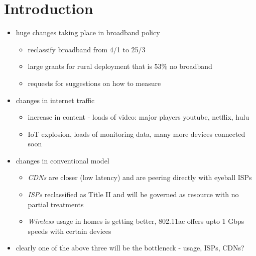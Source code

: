 \section{Introduction}
\label{sec:intro}


\begin{itemize}
\item huge changes taking place in broadband policy
 	\begin{itemize}
 	\item reclassify broadband from 4/1 to 25/3
 	\item large grants for rural deployment that is 53\% no broadband ~\cite{fcc2015progress-report}
 	\item requests for suggestions on how to measure
	\end{itemize}  
\item changes in internet traffic
	\begin{itemize}
	\item increase in content - loads of video: major players youtube, netflix, hulu ~\cite{sandvine2015report}
	\item IoT explosion, loads of monitoring data, many more devices connected soon
	\end{itemize}
\item changes in conventional model
	\begin{itemize}
	\item \emph{CDNs} are closer (low latency) and are peering directly with eyeball ISPs
	\item \emph{ISPs} reclassified as Title II and will be governed as resource with no partial treatments
	\item \emph{Wireless} usage in homes is getting better, 802.11ac offers upto 1 Gbps speeds with certain devices
	\end{itemize}
\item clearly one of the above three will be the bottleneck - usage, ISPs, CDNs?
\end{itemize}



